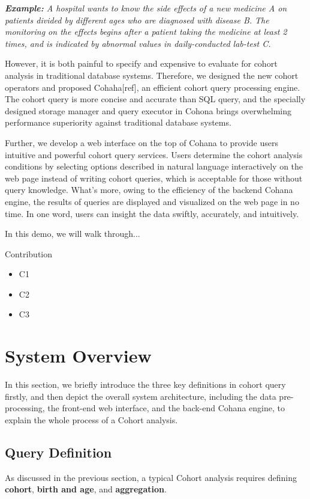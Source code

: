 \documentclass[10pt,conference,letterpaper]{IEEEtran}
\begin{document}
\emph{\textbf{Example:} A hospital wants to know the side effects of a new medicine A on patients divided by different ages who are diagnosed with disease B. The monitoring on the effects begins after a patient taking the medicine at least 2 times, and is indicated by abnormal values in daily-conducted lab-test C.}

However, it is both painful to specify and expensive to evaluate for cohort analysis in traditional database systems. Therefore, we designed the new cohort operators and proposed Cohaha[ref], an efficient cohort query processing engine. The cohort query is more concise and accurate than SQL query, and the specially designed storage manager and query executor in Cohona brings overwhelming performance superiority against traditional database systems. 

Further, we develop a web interface on the top of Cohana to provide users intuitive and powerful cohort query services. Users determine the cohort analysis conditions by selecting options described in natural language interactively on the web page instead of writing cohort queries, which is acceptable for those without query knowledge. What's more, owing to the efficiency of the backend Cohana engine, the results of queries are displayed and visualized on the web page in no time. In one word, users can insight the data swiftly, accurately, and intuitively. 

In this demo, we will walk through...

Contribution
\begin{itemize}
\item	C1
\item   C2
\item   C3
\end{itemize}

\section{System Overview}
In this section, we briefly introduce the three key definitions in cohort query firstly, and then depict the overall system architecture, including the data pre-processing, the front-end web interface, and the back-end Cohana engine, to explain the whole process of a Cohort analysis.  

\subsection{Query Definition}
As discussed in the previous section, a typical Cohort analysis requires defining \textbf{cohort}, \textbf{birth and age}, and \textbf{aggregation}. 
\end{document}
